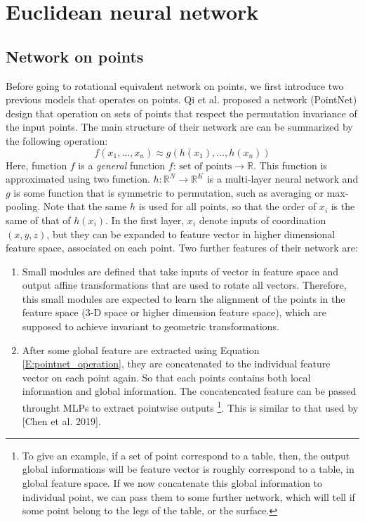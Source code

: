\documentclass{article}
\begin{document}
\section{Euclidean neural network}
\subsection*{Network on points}
Before going to rotational equivalent network on points, we first introduce two previous models that operates 
on points. Qi et al.\cite{qi_pointnet_2017} proposed a network (PointNet) design that operation on sets of points that respect 
the permutation invariance of the input points. The main structure of their network are can be summarized by 
the following operation:
\begin{equation}
    f({x_1,\dots,x_n}) \approx g(h(x_1),\dots,h(x_n)) \label{E:pointnet_operation}
\end{equation}
Here, function $f$ is a \emph{general} function $f\colon\, \text{set of points} \to \mathbb{R}$. This function 
is approximated using two function. $h\colon \mathbb{R}^N\to \mathbb{R}^K $ is a multi-layer neural network
and $g$ is some function that is symmetric to permutation, such as averaging or max-pooling. Note that the same 
$h$ is used for all points, so that the order of $x_i$ is the same of that of $h(x_i)$. 
In the first layer, $x_i$ denote inputs of coordination $(x,y,z)$, but they can be expanded to feature vector 
in higher dimensional feature space, associated on each point.
Two further features of their network are:
\begin{enumerate}
    \item Small modules are defined that take inputs of vector in feature space and output affine transformations that are used to 
            rotate all vectors. Therefore, this small modules are expected to learn the alignment of the points in the feature space 
            (3-D space or higher dimension feature space), which 
            are supposed to achieve invariant to geometric transformations.
    \item After some global feature are extracted using Equation \eqref{E:pointnet_operation}, they are concatenated to the individual
            feature vector on each point again. So that each points contains both local information and global information. The concatencated 
            feature can be passed throught MLPs to extract pointwise outputs
            \footnote{To give an example, if a set of point correspond to a table, then, the output global informations will be feature vector 
            is roughly correspond to a table, in global feature space. If we now concatenate this global information to individual point, we 
            can pass them to some further network, which will tell if some point belong to the legs of the table, or the surface.}. 
            This is similar to that used by [Chen et al. 2019].
\end{enumerate}
\end{document}
